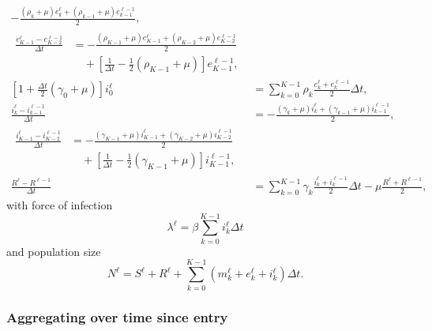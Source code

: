 \documentclass{jpmarticle}
\let\subequationsorig\subequations%
\let\endsubequationsorig\endsubequations%
\renewenvironment{subequations}{
  \subequationsorig
  \renewcommand{\theequation}{\theparentequation.\arabic{equation}}
}{
  \endsubequationsorig
}
\begin{document}
\begin{subequations}
\begin{align}
    - \frac{(\rho_k + \mu) e_k^{\ell}
      + (\rho_{k - 1} + \mu) e_{k - 1}^{\ell - 1}}{2},
    \\
    \begin{split}
      \frac{e_{K - 1}^{\ell} - e_{K - 2}^{\ell - 1}}{\Delta t} &=
      - \frac{(\rho_{K - 1} + \mu) e_{K - 1}^{\ell}
        + (\rho_{K - 2} + \mu) e_{K - 2}^{\ell - 1}}{2}
      \\ & \quad {}
      + \left[
        \frac{1}{\Delta t} - \frac{1}{2} (\rho_{K - 1} + \mu)
      \right] e_{K - 1}^{\ell - 1},
    \end{split}
    \\
    \left[1 + \frac{\Delta t}{2} (\gamma_0 + \mu)\right] i_0^{\ell}
    &= \sum_{k = 0}^{K - 1} \rho_k
    \frac{e_k^{\ell} + e_k^{\ell - 1}}{2}
    \Delta t,
    \\
    \frac{i_k^{\ell} - i_{k - 1}^{\ell - 1}}{\Delta t} &=
    - \frac{(\gamma_k + \mu) i_k^{\ell}
      + (\gamma_{k - 1} + \mu) i_{k - 1}^{\ell - 1}}{2},
    \\
    \begin{split}
      \frac{i_{K - 1}^{\ell} - i_{K - 2}^{\ell - 1}}{\Delta t} &=
      - \frac{(\gamma_{K - 1} + \mu) i_{K - 1}^{\ell}
        + (\gamma_{K - 2} + \mu) i_{K - 2}^{\ell - 1}}{2}
      \\ & \quad {}
      + \left[
        \frac{1}{\Delta t} - \frac{1}{2} (\gamma_{K - 1} + \mu)
      \right] i_{K - 1}^{\ell - 1},
    \end{split}
    \\
    \frac{R^{\ell} - R^{\ell - 1}}{\Delta t}
    &= \sum_{k = 0}^{K - 1} \gamma_k
    \frac{i_k^{\ell} + i_k^{\ell - 1}}{2}
    \Delta t
    - \mu \frac{R^{\ell} + R^{\ell - 1}}{2},
  \end{align}
  with force of infection
  \begin{equation}
    \lambda^{\ell} =
    \beta \sum_{k = 0}^{K - 1} i_k^{\ell} \Delta t
  \end{equation}
  and population size
  \begin{equation}
    N^{\ell} =
    S^{\ell} + R^{\ell}
    + \sum_{k = 0}^{K - 1} \left(
      m_k^{\ell} + e_k^{\ell} + i_k^{\ell}
    \right) \Delta t.
  \end{equation}
\end{subequations}


\subsubsection{Aggregating over time since entry}
\end{document}
